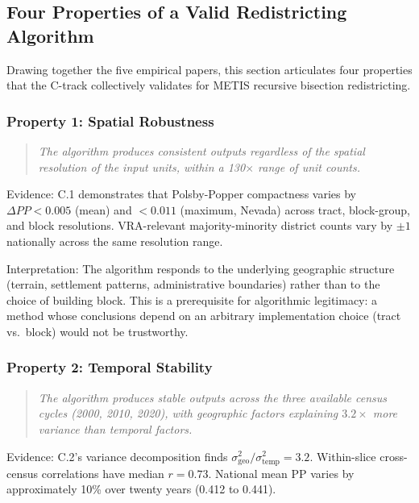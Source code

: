 
\subsection{Four Properties of a Valid Redistricting Algorithm}

Drawing together the five empirical papers, this section articulates
four properties that the C-track collectively validates for METIS
recursive bisection redistricting.

\subsubsection{Property 1: Spatial Robustness}

\begin{quote}
\textit{The algorithm produces consistent outputs regardless of the
spatial resolution of the input units, within a 130$\times$ range
of unit counts.}
\end{quote}

Evidence: C.1 demonstrates that Polsby-Popper compactness varies by
$\Delta PP < 0.005$ (mean) and $< 0.011$ (maximum, Nevada) across
tract, block-group, and block resolutions. VRA-relevant majority-minority
district counts vary by $\pm 1$ nationally across the same resolution
range.

Interpretation: The algorithm responds to the underlying geographic
structure (terrain, settlement patterns, administrative boundaries)
rather than to the choice of building block. This is a prerequisite
for algorithmic legitimacy: a method whose conclusions depend on an
arbitrary implementation choice (tract vs.\ block) would not be
trustworthy.

\subsubsection{Property 2: Temporal Stability}

\begin{quote}
\textit{The algorithm produces stable outputs across the three
available census cycles (2000, 2010, 2020), with geographic factors
explaining $3.2\times$ more variance than temporal factors.}
\end{quote}

Evidence: C.2's variance decomposition finds $\sigma^2_\text{geo} /
\sigma^2_\text{temp} = 3.2$. Within-slice cross-census correlations
have median $r = 0.73$. National mean PP varies by approximately 10\%
over twenty years (0.412 to 0.441).

